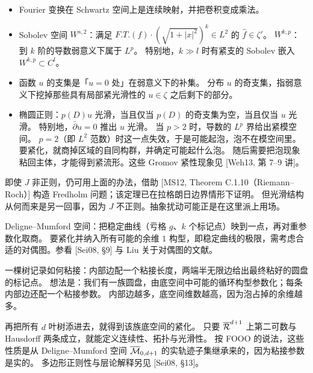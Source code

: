 \begin{itemize}[leftmargin=1.6em,itemsep=0.2em]
\item Fourier 变换在 Schwartz 空间上是连续映射，并把卷积变成乘法。
\item Sobolev 空间 $W^{s,2}$：满足 $F.T.(f)\cdot(\sqrt{1+|x|^2})^k\in L^2$ 的 $\hat f\in\zeta'$。
      $W^{k,p}$：到 $k$ 阶的导数弱意义下属于 $L^p$。
      特别地，$k\gg l$ 时有紧支的 Sobolev 嵌入 $W^{k,p}\subset C^l$。
\item 函数 $u$ 的支集是「$u=0$ 处」在弱意义下的补集。
      分布 $u$ 的奇支集，指弱意义下挖掉那些具有局部紧光滑性的 $u\in\zeta$ 之后剩下的部分。
\item 椭圆正则：$p(D)u$ 光滑，当且仅当 $p(D)$ 的奇支集为空，当且仅当 $u$ 光滑。
      特别地，$\bar\partial u=0$ 推出 $u$ 光滑。
      当 $p>2$ 时，导数的 $L^p$ 界给出紧模空间。
      $p=2$（即 $L^2$ 范数）时这一点失效，于是可能起泡，泡不在模空间里。
      要紧化，就商掉区域的自同构群，并确定可能起什么泡。
      随后需要把泡现象粘回主体，才能得到紧流形。这些 Gromov 紧性现象见 [Weh13, 第 7--9 讲]。
\end{itemize}

\begin{remark}\label{c7:rem-nonregular-J}
即使 $J$ 非正则，仍可用上面的办法，借助 [MS12, Theorem C.1.10（Riemann--Roch）] 构造 Fredholm 问题；该定理已在拉格朗日边界情形下证明。
但光滑结构从何而来是另一回事，因为 $J$ 不正则。抽象扰动可能正是在这里派上用场。
\end{remark}

\begin{example}[区域的模空间]\label{c7:ex-dm-space}
Deligne--Mumford 空间：把稳定曲线（亏格 $g$、$k$ 个标记点）映到一点，再对重参数化取商。
要紧化并纳入所有可能的余维 $1$ 构型，即稳定曲线的极限，需考虑合适的对偶图。参看 [Sei08, §9] 与 Liu 关于对偶图的文献。

一棵树记录如何粘接：内部边配一个粘接长度，两端半无限边给出最终粘好的圆盘的标记点。
想法是：我们有一族圆盘，由底空间中可能的循环构型参数化；每条内部边还配一个粘接参数。
内部边越多，底空间维数越高，因为泡占掉的余维越多。

再把所有 $d$ 叶树添进去，就得到该族底空间的紧化。
只要 $\overline{\mathcal{R}}^{d+1}$ 上第二可数与 Hausdorff 两条成立，就能定义连续性、拓扑与光滑性。
按 FOOO 的说法，这些性质是从 Deligne--Mumford 空间 $\overline{\mathcal{M}}_{0,d+1}$ 的实轨迹子集继承来的，因为粘接参数是实的。
多边形正则性与层论解释另见 [Sei08, §13]。
\end{example}

